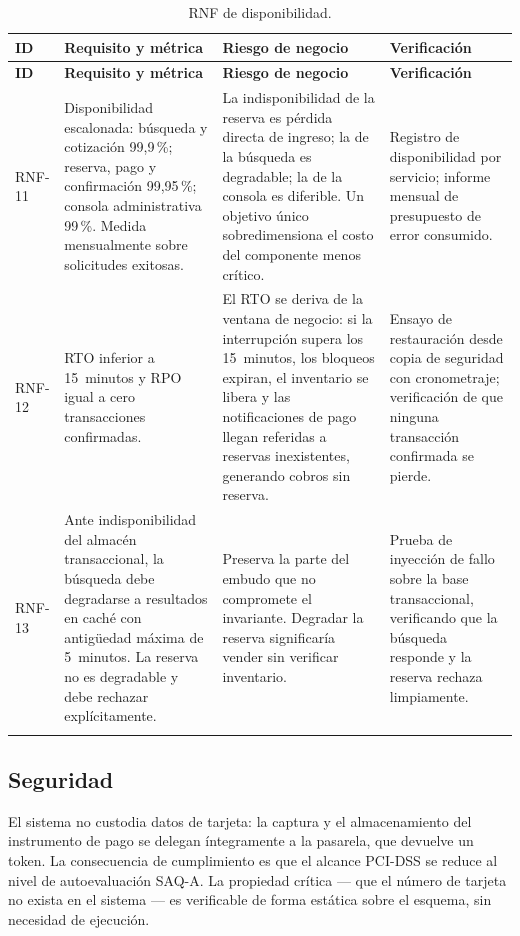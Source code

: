 \documentclass[10pt,letterpaper]{article}
\begin{document}
\begin{longtable}{@{}L{1.5cm} L{5.0cm} L{4.6cm} L{4.9cm}@{}}
\toprule \textbf{ID} & \textbf{Requisito y métrica} & \textbf{Riesgo de negocio} & \textbf{Verificación} \\ \midrule \endfirsthead
\toprule \textbf{ID} & \textbf{Requisito y métrica} & \textbf{Riesgo de negocio} & \textbf{Verificación} \\ \midrule \endhead
RNF-11 & Disponibilidad escalonada: búsqueda y cotización 99{,}9\,\%; reserva, pago y confirmación 99{,}95\,\%; consola administrativa 99\,\%. Medida mensualmente sobre solicitudes exitosas. & La indisponibilidad de la reserva es pérdida directa de ingreso; la de la búsqueda es degradable; la de la consola es diferible. Un objetivo único sobredimensiona el costo del componente menos crítico. & Registro de disponibilidad por servicio; informe mensual de presupuesto de error consumido. \\
RNF-12 & RTO inferior a 15~minutos y RPO igual a cero transacciones confirmadas. & El RTO se deriva de la ventana de negocio: si la interrupción supera los 15~minutos, los bloqueos expiran, el inventario se libera y las notificaciones de pago llegan referidas a reservas inexistentes, generando cobros sin reserva. & Ensayo de restauración desde copia de seguridad con cronometraje; verificación de que ninguna transacción confirmada se pierde. \\
RNF-13 & Ante indisponibilidad del almacén transaccional, la búsqueda debe degradarse a resultados en caché con antigüedad máxima de 5~minutos. La reserva no es degradable y debe rechazar explícitamente. & Preserva la parte del embudo que no compromete el invariante. Degradar la reserva significaría vender sin verificar inventario. & Prueba de inyección de fallo sobre la base transaccional, verificando que la búsqueda responde y la reserva rechaza limpiamente. \\
\bottomrule
\caption{RNF de disponibilidad.}
\end{longtable}

\subsection{Seguridad}
El sistema no custodia datos de tarjeta: la captura y el almacenamiento del instrumento de pago se delegan íntegramente a la pasarela, que devuelve un token. La consecuencia de cumplimiento es que el alcance PCI-DSS se reduce al nivel de autoevaluación SAQ-A. La propiedad crítica --- que el número de tarjeta no exista en el sistema --- es verificable de forma estática sobre el esquema, sin necesidad de ejecución.
\end{document}
